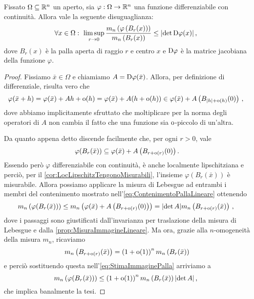 \begin{lemma}\label{lemma:LimiteDeterminante}
	Fissato $\Omega\subseteq\mathbb R^n$ un aperto, sia $\varphi:\Omega\to\mathbb R^n$ una funzione differenziabile con continuità.
	Allora vale la seguente disuguaglianza:
	\begin{equation*}
		\forall x\in\Omega:\ \limsup_{r\to 0} \frac{ m_n\left(\varphi\left(B_r(x)\right)\right)} {m_n\left(B_r(x)\right)}\le \lvert\det \mathrm D \varphi(x)\rvert \, \text{, } 
	\end{equation*}
	dove $B_r(x)$ è la palla aperta di raggio $r$ e centro $x$ e $\mathrm D \varphi$ è la matrice jacobiana della funzione $\varphi$.
\end{lemma}
\begin{proof}
	Fissiamo $\bar x\in\Omega$ e chiamiamo $A=\mathrm D  \varphi(\bar x)$.
	Allora, per definizione di differenziale, risulta vero che
	\begin{equation*}
		\varphi(\bar x+h)=\varphi(\bar x)+Ah+\mathrm{o}(h)=\varphi(\bar x)+A(h+\mathrm{o}(h))\in \varphi(\bar x)+A\left(B_{|h|+\mathrm{o}(h)}(0)\right) \, \text{, }
	\end{equation*}
	dove abbiamo implicitamente sfruttato che moltiplicare per la norma degli operatori di $A$ non cambia il fatto che una funzione sia $\mathrm{o}$-piccolo di un'altra.
	
	Da quanto appena detto discende facilmente che, per ogni $r>0$, vale
	\begin{equation}\label{eq:ContenimentoPallaLineare}
		\varphi(B_r(\bar x))\subseteq \varphi(\bar x)+A\left(B_{r+\mathrm{o}(r)}(0)\right).
	\end{equation}
	Essendo però $\varphi$ differenziabile con continuità, è anche localmente lipschitziana e perciò, per il \cref{cor:LocLipschitzTengonoMisurabili}, l'insieme $\varphi(B_r(\bar x))$ è misurabile.
	Allora possiamo applicare la misura di Lebesgue ad entrambi i membri del contenimento mostrato nell'\cref{eq:ContenimentoPallaLineare} ottenendo
	\begin{equation}\label{eq:StimaImmaginePalla}
		m_n\left( \varphi(B_r(\bar x)) \right)\le m_n\left(\varphi(\bar x)+A\left(B_{r+\mathrm{o}(r)}(0)\right)\right)
		=\lvert \det A\rvert m_n\left(B_{r+\mathrm{o}(r)}(\bar x)\right)\, \text{, }
	\end{equation}
	dove i passaggi sono giustificati dall'invarianza per traslazione della misura di Lebesgue e dalla \cref{prop:MisuraImmagineLineare}.
	Ma ora, grazie alla $n$-omogeneità della misura $m_n$, ricaviamo
	\begin{equation*} 
		m_n\left(B_{r+\mathrm{o}(r)}(\bar x)\right)=\left(1+\mathrm{o}(1)\right)^n m_n\left( B_r(\bar x)\right)
	\end{equation*}
	e perciò sostituendo questa nell'\cref{eq:StimaImmaginePalla} arriviamo a
	\begin{equation*}
		m_n\left( \varphi(B_r(\bar x)) \right)\le \left(1+\mathrm{o}(1)\right)^n m_n\left( B_r(\bar x)\right)\lvert \det A\rvert \, \text{, }
	\end{equation*}
	che implica banalmente la tesi.
\end{proof}

